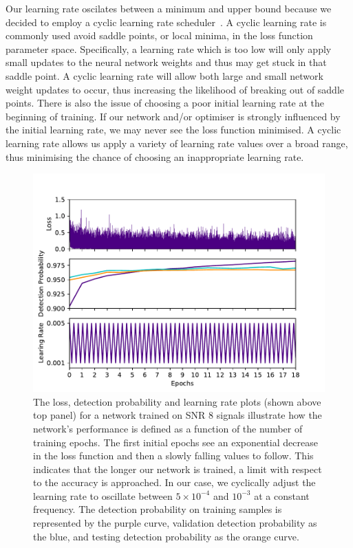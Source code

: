 %
%
Our learning rate oscilates between a minimum and upper bound because 
we decided to employ a cyclic learning rate
scheduler~\cite{2015arXiv150601186S}. A cyclic learning rate is 
commonly used avoid saddle points, or local minima, in the 
loss function parameter space. Specifically, a learning rate which 
is too low will only apply small updates to the neural network weights and 
thus may get stuck in that saddle point. A cyclic learning rate 
will allow both large and small network weight updates to occur, thus 
increasing the likelihood of breaking out of saddle points. There is 
also the issue of choosing a poor initial learning rate at the beginning 
of training. If our network and/or optimiser is strongly influenced 
by the initial learning rate, we may never see the loss function 
minimised. A cyclic learning rate allows us apply a variety of learning 
rate values over a broad range, thus minimising the chance of choosing 
an inappropriate learning rate.

\begin{figure} 
\includegraphics[width=\columnwidth]{figures/matching_matched_filtering_loss.pdf}
\caption[CNN loss, detection probability and learning rate plots illustrate 
how the network's performance is defined as a function of the number of 
training epochs.]{\label{fig:loss_curve} The loss, detection 
probability and learning rate plots (shown above top panel) for 
a network trained on \ac{SNR} 8 signals 
illustrate how the network's performance is defined as a function 
of the number of training epochs. The first initial epochs see an 
exponential decrease in the loss function and then a slowly falling 
values to follow. This indicates that the longer our network is trained, 
a limit with respect to the accuracy is approached. In our case, we 
cyclically adjust the learning rate to oscillate between 
$5 \times 10^{-4}$ and $10^{-3}$ at a constant frequency. The 
detection probability on training samples is represented by 
the purple curve, validation detection probability as the 
blue, and testing detection probability as the orange 
curve.}
\end{figure}

